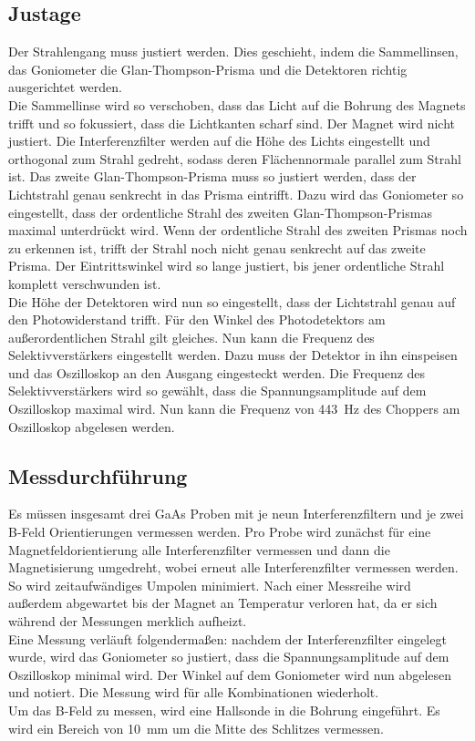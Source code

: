 \subsection{Justage}
\noindent Der Strahlengang muss justiert werden. Dies geschieht, indem die Sammellinsen, das Goniometer die Glan-Thompson-Prisma und 
die Detektoren richtig ausgerichtet werden. \\
Die Sammellinse wird so verschoben, dass das Licht auf die Bohrung des Magnets trifft und so fokussiert, dass die Lichtkanten scharf sind. 
Der Magnet wird nicht justiert.
Die Interferenzfilter werden auf die Höhe des Lichts eingestellt und orthogonal zum Strahl gedreht, sodass deren Flächennormale parallel zum 
Strahl ist. Das zweite Glan-Thompson-Prisma muss so justiert werden, dass der Lichtstrahl genau senkrecht in das Prisma eintrifft. Dazu wird 
das Goniometer so eingestellt, dass der ordentliche Strahl des zweiten Glan-Thompson-Prismas maximal unterdrückt wird. Wenn der ordentliche 
Strahl des zweiten Prismas noch zu erkennen ist, trifft der Strahl noch nicht genau senkrecht auf das zweite Prisma. Der Eintrittswinkel wird 
so lange justiert, bis jener ordentliche Strahl komplett verschwunden ist. \\
Die Höhe der Detektoren wird nun so eingestellt, dass der Lichtstrahl genau auf den Photowiderstand trifft. Für den Winkel des Photodetektors 
am außerordentlichen Strahl gilt gleiches.
Nun kann die Frequenz des Selektivverstärkers eingestellt werden. Dazu muss der Detektor in ihn einspeisen und das Oszilloskop an den Ausgang 
eingesteckt werden. Die Frequenz des Selektivverstärkers wird so gewählt, dass die Spannungsamplitude auf dem Oszilloskop maximal wird.
Nun kann die Frequenz von \qty{443}{\hertz} des Choppers am Oszilloskop abgelesen werden.


\subsection{Messdurchführung}
\noindent Es müssen insgesamt drei GaAs Proben mit je neun Interferenzfiltern und je zwei B-Feld Orientierungen vermessen werden.
Pro Probe wird zunächst für eine Magnetfeldorientierung alle Interferenzfilter vermessen und dann die Magnetisierung umgedreht, wobei erneut alle 
Interferenzfilter vermessen werden. So wird zeitaufwändiges Umpolen minimiert. Nach einer Messreihe wird außerdem abgewartet bis der Magnet an 
Temperatur verloren hat, da er sich während der Messungen merklich aufheizt.\\
Eine Messung verläuft folgendermaßen: nachdem der Interferenzfilter eingelegt wurde, wird das Goniometer so justiert, dass die Spannungsamplitude 
auf dem Oszilloskop minimal wird. Der Winkel auf dem Goniometer wird nun abgelesen und notiert. Die Messung wird für alle Kombinationen wiederholt.\\
Um das B-Feld zu messen, wird eine Hallsonde in die Bohrung eingeführt. Es wird ein Bereich von \qty{10}{\milli \meter} um die Mitte des Schlitzes 
vermessen. 



